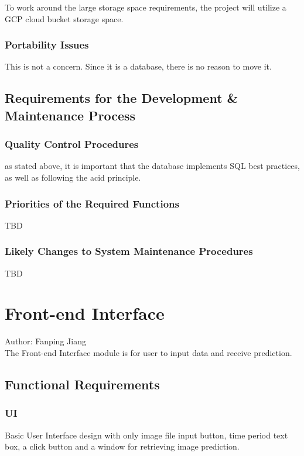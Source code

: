 \documentclass[12pt]{article}
\begin{document}
To work around the large storage space requirements, the project will utilize a GCP cloud bucket
storage space.

\subsubsection {Portability Issues}

This is not a concern. Since it is a database, there is no reason to move it.

\subsection{Requirements for the Development \& Maintenance Process}


\subsubsection {Quality Control Procedures}

as stated above, it is important that the database implements SQL best practices, as well as
following the acid principle.

\subsubsection {Priorities of the Required Functions}

TBD

\subsubsection {Likely Changes to System Maintenance Procedures}

TBD

\section{Front-end Interface}
Author: Fanping Jiang\\

\noindent The Front-end Interface module is for user to input data and receive prediction.

\subsection{Functional Requirements}
\subsubsection{UI}
Basic User Interface design with only image file input button, time period text box, a click button and a window for retrieving image prediction.
\end{document}
